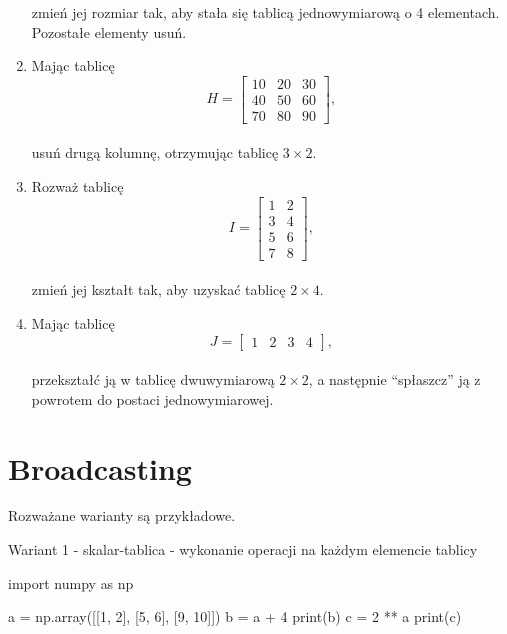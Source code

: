 \documentclass[
  letterpaper,
  DIV=11,
  numbers=noendperiod]{scrreprt}
\newenvironment{Shaded}{\begin{snugshade}}{\end{snugshade}}
\newcommand{\BuiltInTok}[1]{\textcolor[rgb]{0.00,0.23,0.31}{#1}}
\newcommand{\DecValTok}[1]{\textcolor[rgb]{0.68,0.00,0.00}{#1}}
\newcommand{\ImportTok}[1]{\textcolor[rgb]{0.00,0.46,0.62}{#1}}
\newcommand{\NormalTok}[1]{\textcolor[rgb]{0.00,0.23,0.31}{#1}}
\newcommand{\OperatorTok}[1]{\textcolor[rgb]{0.37,0.37,0.37}{#1}}
\begin{document}
\begin{enumerate}
  zmień jej rozmiar tak, aby stała się tablicą jednowymiarową o 4
  elementach. Pozostałe elementy usuń.
\item
  Mając tablicę\\
  \[H = \begin{bmatrix}10 & 20 & 30 \\ 40 & 50 & 60 \\ 70 & 80 & 90\end{bmatrix},\]\\
  usuń drugą kolumnę, otrzymując tablicę \(3 \times 2\).
\item
  Rozważ tablicę\\
  \[I = \begin{bmatrix}1 & 2 \\ 3 & 4 \\ 5 & 6 \\ 7 & 8\end{bmatrix},\]\\
  zmień jej kształt tak, aby uzyskać tablicę \(2 \times 4\).
\item
  Mając tablicę\\
  \[J = \begin{bmatrix}1 & 2 & 3 & 4\end{bmatrix},\]\\
  przekształć ją w tablicę dwuwymiarową \(2 \times 2\), a następnie
  ``spłaszcz'' ją z powrotem do postaci jednowymiarowej.
\end{enumerate}

\chapter{Broadcasting}\label{broadcasting}

Rozważane warianty są przykładowe.

Wariant 1 - skalar-tablica - wykonanie operacji na każdym elemencie
tablicy

\begin{Shaded}
\begin{Highlighting}[]
\ImportTok{import}\NormalTok{ numpy }\ImportTok{as}\NormalTok{ np}

\NormalTok{a }\OperatorTok{=}\NormalTok{ np.array([[}\DecValTok{1}\NormalTok{, }\DecValTok{2}\NormalTok{], [}\DecValTok{5}\NormalTok{, }\DecValTok{6}\NormalTok{], [}\DecValTok{9}\NormalTok{, }\DecValTok{10}\NormalTok{]])}
\NormalTok{b }\OperatorTok{=}\NormalTok{ a }\OperatorTok{+} \DecValTok{4}
\BuiltInTok{print}\NormalTok{(b)}
\NormalTok{c }\OperatorTok{=} \DecValTok{2} \OperatorTok{**}\NormalTok{ a}
\BuiltInTok{print}\NormalTok{(c)}
\end{Highlighting}
\end{Shaded}
\end{document}
